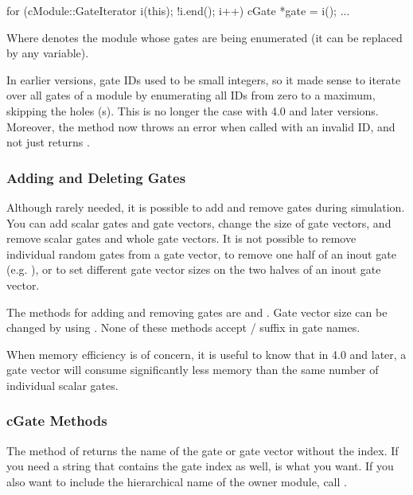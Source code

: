 \begin{cpp}
for (cModule::GateIterator i(this); !i.end(); i++) {
    cGate *gate = i();
    ...
}
\end{cpp}

Where  denotes the module whose gates are being enumerated
(it can be replaced by any  variable).

\begin{note}
    In earlier {\opp} versions, gate IDs used to be small integers, so
    it made sense to iterate over all gates of a module by enumerating
    all IDs from zero to a maximum, skipping the holes (s).
    This is no longer the case with {\opp} 4.0 and later versions.
    Moreover, the  method now throws an error when called
    with an invalid ID, and not just returns .
\end{note}


\subsubsection{Adding and Deleting Gates}

Although rarely needed, it is possible to add and remove gates during
simulation. You can add scalar gates and gate vectors, change the size of
gate vectors, and remove scalar gates and whole gate vectors.
It is not possible to remove individual random gates from a gate vector,
to remove one half of an inout gate (e.g. ), or to set
different gate vector sizes on the two halves of an inout gate vector.

The  methods for adding and removing gates are
 and .
Gate vector size can be changed by using .
None of these methods accept  /  suffix in gate names.

\begin{note}
    When memory efficiency is of concern, it is useful to know that
    in {\opp} 4.0 and later, a gate vector will consume significantly less
    memory than the same number of individual scalar gates.
\end{note}


\subsubsection{cGate Methods}

The  method of  returns the name of the
gate or gate vector without the index. If you need a string that contains the gate index
as well,  is what you want. If you also want to
include the hierarchical name of the owner module, call .

